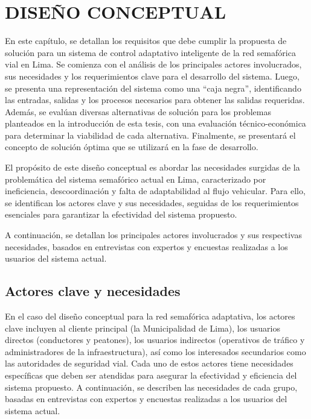 \documentclass[12pt,a4paper,oneside]{report}
\begin{document}
\chapter{DISEÑO CONCEPTUAL}\label{capuxedtulo-3-diseuxf1o-conceptual}

En este capítulo, se detallan los requisitos que debe cumplir la propuesta de solución para un sistema de control adaptativo inteligente de la red semafórica vial en Lima. Se comienza con el análisis de los principales actores involucrados, sus necesidades y los requerimientos clave para el desarrollo del sistema. Luego, se presenta una representación del sistema como una ``caja negra'', identificando las entradas, salidas y los procesos necesarios para obtener las salidas requeridas. Además, se evalúan diversas alternativas de solución para los problemas planteados en la introducción de esta tesis, con una evaluación técnico-económica para determinar la viabilidad de cada alternativa. Finalmente, se presentará el concepto de solución óptima que se utilizará en la fase de desarrollo.

El propósito de este diseño conceptual es abordar las necesidades surgidas de la problemática del sistema semafórico actual en Lima, caracterizado por ineficiencia, descoordinación y falta de adaptabilidad al flujo vehicular. Para ello, se identifican los actores clave y sus necesidades, seguidas de los requerimientos esenciales para garantizar la efectividad del sistema propuesto.

A continuación, se detallan los principales actores involucrados y sus respectivas necesidades, basados en entrevistas con expertos y encuestas realizadas a los usuarios del sistema actual.

\section{Actores clave y necesidades}\label{actores-clave-y-necesidades}

En el caso del diseño conceptual para la red semafórica adaptativa, los actores clave incluyen al cliente principal (la Municipalidad de Lima), los usuarios directos (conductores y peatones), los usuarios indirectos (operativos de tráfico y administradores de la infraestructura), así como los interesados secundarios como las autoridades de seguridad vial. Cada uno de estos actores tiene necesidades específicas que deben ser atendidas para asegurar la efectividad y eficiencia del sistema propuesto. A continuación, se describen las necesidades de cada grupo, basadas en entrevistas con expertos y encuestas realizadas a los usuarios del sistema actual.
\end{document}
